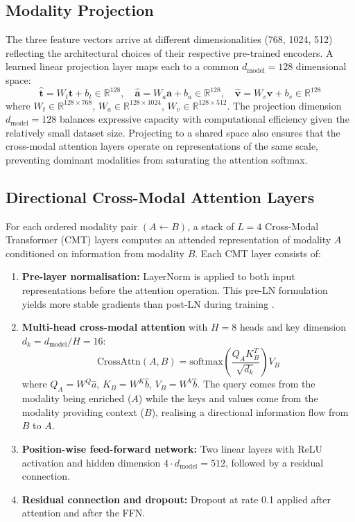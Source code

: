 \subsection{Modality Projection}

The three feature vectors arrive at different dimensionalities (768, 1024, 512) reflecting the architectural choices of their respective pre-trained encoders. A learned linear projection layer maps each to a common $d_{\text{model}} = 128$ dimensional space:
\[
\hat{\mathbf{t}} = W_t \mathbf{t} + b_t \in \mathbb{R}^{128}, \quad
\hat{\mathbf{a}} = W_a \mathbf{a} + b_a \in \mathbb{R}^{128}, \quad
\hat{\mathbf{v}} = W_v \mathbf{v} + b_v \in \mathbb{R}^{128}
\]
where $W_t \in \mathbb{R}^{128 \times 768}$, $W_a \in \mathbb{R}^{128 \times 1024}$, $W_v \in \mathbb{R}^{128 \times 512}$. The projection dimension $d_{\text{model}} = 128$ balances expressive capacity with computational efficiency given the relatively small dataset size. Projecting to a shared space also ensures that the cross-modal attention layers operate on representations of the same scale, preventing dominant modalities from saturating the attention softmax.

\subsection{Directional Cross-Modal Attention Layers}

For each ordered modality pair $(A \leftarrow B)$, a stack of $L = 4$ Cross-Modal Transformer (CMT) layers computes an attended representation of modality $A$ conditioned on information from modality $B$. Each CMT layer consists of:

\begin{enumerate}
    \item \textbf{Pre-layer normalisation:} LayerNorm is applied to both input representations before the attention operation. This pre-LN formulation yields more stable gradients than post-LN during training \cite{vaswani2017attention}.
    \item \textbf{Multi-head cross-modal attention} with $H = 8$ heads and key dimension $d_k = d_{\text{model}} / H = 16$:
    \[
    \text{CrossAttn}(A, B) = \text{softmax}\left(\frac{Q_A K_B^T}{\sqrt{d_k}}\right) V_B
    \]
    where $Q_A = W^Q \hat{a}$, $K_B = W^K \hat{b}$, $V_B = W^V \hat{b}$. The query comes from the modality being enriched ($A$) while the keys and values come from the modality providing context ($B$), realising a directional information flow from $B$ to $A$.
    \item \textbf{Position-wise feed-forward network:} Two linear layers with ReLU activation and hidden dimension $4 \cdot d_{\text{model}} = 512$, followed by a residual connection.
    \item \textbf{Residual connection and dropout:} Dropout at rate 0.1 applied after attention and after the FFN.
\end{enumerate}


